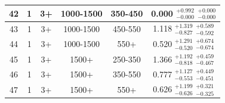 \begin{table}[htbp]
\begin{centering}
\begin{tabular}{|c|c|c|c|c||c|}
\hline
42 &               1 &              3+ &       1000-1500 &         350-450 & 0.000 $^{+0.992}_{-0.000}$ $^{+0.000}_{-0.000}$ \\ 
\hline
43 &               1 &              3+ &       1000-1500 &         450-550 & 1.118 $^{+1.319}_{-0.827}$ $^{+0.589}_{-0.592}$ \\ 
\hline
44 &               1 &              3+ &       1000-1500 &            550+ & 0.520 $^{+1.291}_{-0.520}$ $^{+0.674}_{-0.674}$ \\ 
\hline
45 &               1 &              3+ &           1500+ &         250-350 & 1.366 $^{+1.192}_{-0.818}$ $^{+0.459}_{-0.467}$ \\ 
\hline
46 &               1 &              3+ &           1500+ &         350-550 & 0.777 $^{+1.127}_{-0.553}$ $^{+0.449}_{-0.451}$ \\ 
\hline
47 &               1 &              3+ &           1500+ &            550+ & 0.626 $^{+1.199}_{-0.626}$ $^{+0.321}_{-0.325}$ \\ 
\hline
\end{tabular}
\par\end{centering}
\end{table}

